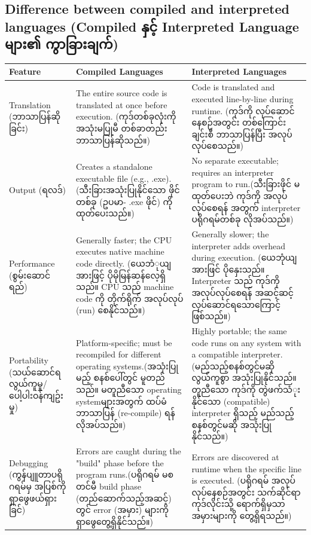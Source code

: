 \documentclass{report}
\begin{document}
\subsection{Difference between compiled and interpreted languages (\burmesefont  Compiled နှင့် Interpreted Language များ၏ ကွာခြားချက်)}
\begin{center}
\renewcommand{\arraystretch}{1.5}
\begin{tabular}{|p{3cm}|p{5cm}|p{5cm}|}
\hline
\textbf{Feature} & \textbf{Compiled Languages} & \textbf{Interpreted Languages} \\
\hline
Translation (\burmesefont ဘာသာပြန်ဆိုခြင်း) & The entire source code is translated at once before execution. (\burmesefont ကုဒ်တစ်ခုလုံးကို အသုံးမပြုမီ တစ်ခာတည်း ဘာသာပြန်ဆိုသည်။) & Code is translated and executed line-by-line during runtime. (\burmesefont ကုဒ်ကို လုပ်ဆောင်နေစဉ်အတွင်း တစ်ကြောင်းချင်းစီ ဘာသာပြန်ပြီး အလုပ်လုပ်စေသည်။)\\
\hline
Output (\burmesefont ရလဒ်) & Creates a standalone executable file (e.g., .exe). (\burmesefont သီးခြားအသုံးပြုနိုင်သော ဖိုင်တစ်ခု (ဥပမာ- .exe ဖိုင်) ကို ထုတ်ပေးသည်။) & No separate executable; requires an interpreter program to run.(\burmesefont သီးခြားဖိုင် မထုတ်ပေးဘဲ ကုဒ်ကို အလုပ်လုပ်စေရန် အတွက် interpreter ပရိုဂရမ်တစ်ခု လိုအပ်သည်။) \\
\hline
Performance (\burmesefont စွမ်းဆောင်ရည်) & Generally faster; the CPU executes native machine code directly. (\burmesefont ယေဘံုယျအားဖြင့် ပိုမိုမြန်ဆန်လေ့ရှိသည်။ CPU သည် machine code ကို တိုက်ရိုက် အလုပ်လုပ် (run) စေနိုင်သည်။) & Generally slower; the interpreter adds overhead during execution. (\burmesefont ယေဘုံယျအားဖြင် ပိုနှေးသည်။ Interpreter သည် ကုဒ်ကို အလုပ်လုပ်စေရန် အဆင့်ဆင့် လုပ်ဆောင်ရသောကြောင့် ဖြစ်သည်။)\\
\hline
Portability (\burmesefont သယ်ဆောင်ရလွယ်ကူမှု/ပေါ့ပါးဝန်ကျဥ်းမှု) & Platform-specific; must be recompiled for different operating systems.(\burmesefont အသုံးပြုမည့် စနစ်ပေါ်တွင် မူတည်သည်။ မတူညီသော operating systemများအတွက် ထပ်မံ ဘာသာပြန် (re-compile) ရန် လိုအပ်သည်။) & Highly portable; the same code runs on any system with a compatible interpreter. (\burmesefont မည်သည့်စနစ်တွင်မဆို လွယ်ကူစွာ အသုံးပြုနိုင်သည်။ တူညီသော ကုဒ်ကို တွဲဖက်သံုးနိုင်သော (compatible) interpreter ရှိသည့် မည်သည့်စနစ်တွင်မဆို အသုံးပြုနိုင်သည်။)\\
\hline
Debugging (\burmesefont ကွန်ပျူတာပရိုဂရမ်မှ အပြစ်ကို ရှာဖွေဖယ်ရှားခြင်)& Errors are caught during the "build" phase before the program runs.(\burmesefont ပရိုဂရမ် မစတင်မီ build phase (တည်ဆောက်သည့်အဆင့်) တွင် error (အမှား) များကို ရှာဖွေတွေ့ရှိနိုင်သည်။) & Errors are discovered at runtime when the specific line is executed. (\burmesefont ပရိုဂရမ် အလုပ်လုပ်နေစဉ်အတွင်း သက်ဆိုင်ရာကုဒ်လိုင်းသို့ ရောက်ရှိမှသာ အမှားများကို တွေ့ရှိရသည်။)\\
\hline
\end{tabular}
\end{center}
\end{document}
